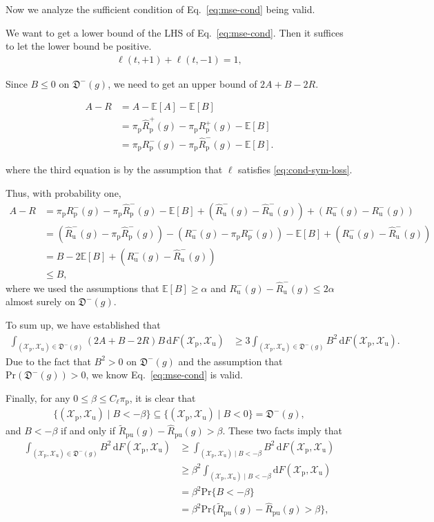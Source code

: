 \documentclass[12pt]{article}
\newcommand{\dif}{\mathrm{d}}
\newcommand{\pr}{\mathrm{Pr}}
\newcommand{\bE}{\mathbb{E}}
\newcommand{\cX}{\mathcal{X}}
\newcommand{\fD}{\mathfrak{D}}
\newcommand{\pip}{\pi_\mathrm{p}}
\newcommand{\Xp}{\cX_\mathrm{p}}
\newcommand{\Xu}{\cX_\mathrm{u}}
\newcommand{\Rp}{R_\mathrm{p}}
\newcommand{\Ru}{R_\mathrm{u}}
\newcommand{\hRp}{\widehat{R}_\mathrm{p}}
\newcommand{\hRu}{\widehat{R}_\mathrm{u}}
\newcommand{\hRpu}{\widehat{R}_\mathrm{pu}}
\newcommand{\tRpu}{\widetilde{R}_\mathrm{pu}}
\theoremstyle{definition}
\begin{document}
Now we analyze the sufficient condition of Eq.~\eqref{eq:mse-cond} being valid.

We want to get a lower bound of the LHS of Eq.~\eqref{eq:mse-cond}. Then it suffices to let the lower bound be positive.
\begin{align}
\label{eq:cond-sym-loss}%
\ell(t,+1)+\ell(t,-1)=1,
\end{align}

Since $B\le 0$ on $\fD^-(g)$, we need to get an upper bound of $2A+B-2R$.

\begin{align*}
A-R
&= A-\bE[A]-\bE[B]\\
&= \pip\hRp^+(g)-\pip\Rp^+(g)-\bE[B]\\
&= \pip\Rp^-(g)-\pip\hRp^-(g)-\bE[B].
\end{align*}

where the third equation is by the assumption that $\ell$ satisfies \eqref{eq:cond-sym-loss}.

Thus, with probability one,
\begin{align*}
A-R
&= \pip\Rp^-(g)-\pip\hRp^-(g)-\bE[B]+(\hRu^-(g)-\hRu^-(g))+(\Ru^-(g)-\Ru^-(g))\\
&= (\hRu^-(g)-\pip\hRp^-(g))-(\Ru^-(g)-\pip\Rp^-(g))-\bE[B]+(\Ru^-(g)-\hRu^-(g))\\
&= B-2\bE[B]+(\Ru^-(g)-\hRu^-(g))\\
&\le B,
\end{align*}
where we used the assumptions that $\bE[B]\ge\alpha$ and $\Ru^-(g)-\hRu^-(g)\le2\alpha$ almost surely on $\fD^-(g)$. 

To sum up, we have established that
\begin{align*}
\int_{(\Xp,\Xu)\in\fD^-(g)}(2A+B-2R)B\,\dif F(\Xp,\Xu)
&\ge 3\int_{(\Xp,\Xu)\in\fD^-(g)}B^2\,\dif F(\Xp,\Xu).
\end{align*}
Due to the fact that $B^2>0$ on $\fD^-(g)$ and the assumption that $\pr(\fD^-(g))>0$, we know Eq.~\eqref{eq:mse-cond} is valid. 

Finally, for any $0\le\beta\le C_\ell\pip$, it is clear that
\begin{align*}
\{(\Xp,\Xu)\mid B<-\beta\}
\subseteq\{(\Xp,\Xu)\mid B<0\}
=\fD^-(g),
\end{align*}
and $B<-\beta$ if and only if $\tRpu(g)-\hRpu(g)>\beta$. These two facts imply that
\begin{align*}
\int_{(\Xp,\Xu)\in\fD^-(g)}B^2\,\dif F(\Xp,\Xu)
&\ge \int_{(\Xp,\Xu) \mid B<-\beta}B^2\,\dif F(\Xp,\Xu)\\
&\ge \beta^2\int_{(\Xp,\Xu) \mid B<-\beta}\dif F(\Xp,\Xu)\\
&= \beta^2\pr\{B<-\beta\}\\
&= \beta^2\pr\{\tRpu(g)-\hRpu(g)>\beta\},
\end{align*}
\end{document}
